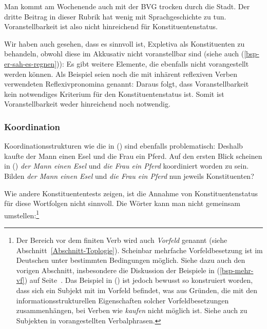 \documentclass[ number=45
			   ,series=eotms
			   ,printondemand
			  ]{langsci}
\let\citew=\citealp
\begin{document}
{\eal
\ex Man kommt am Wochenende auch mit der BVG trocken durch die Stadt.
\ex Der dritte Beitrag in dieser Rubrik hat wenig mit Sprachgeschichte zu tun.
\zl
Voranstellbarkeit ist also nicht hinreichend für Konstituentenstatus.

Wir haben auch gesehen, dass es sinnvoll ist, Expletiva als Konstituenten zu behandeln,
obwohl diese im Akkusativ nicht voranstellbar sind (siehe auch (\ref{bsp-er-sah-es-regnen})):
\eal
{}
\zl
Es gibt weitere Elemente, die ebenfalls nicht vorangestellt werden können. Als Beispiel
seien noch die mit inhärent reflexiven Verben verwendeten Reflexivpronomina genannt:
\eal
{}
\zl
Daraus folgt, dass Voranstellbarkeit kein notwendiges Kriterium für den Konstituentenstatus
ist. Somit ist Voranstellbarkeit weder hinreichend noch notwendig.


\subsubsection{Koordination}
\label{Abschnitt-K-Tests-Koordination}

Koordinationsstrukturen wie die in () sind ebenfalls problematisch:
\ea
\label{ex-gapping}
Deshalb kaufte der Mann einen Esel und die Frau ein Pferd.
\z
Auf den ersten Blick scheinen in () \emph{der Mann einen Esel} und \emph{die Frau ein Pferd}
koordiniert worden zu sein. Bilden \emph{der Mann einen Esel} und \emph{die Frau ein Pferd} nun jeweils Konstituenten?

Wie andere Konstituententests zeigen, ist die Annahme von Konstituentenstatus für diese Wortfolgen
nicht sinnvoll. Die Wörter kann man nicht gemeinsam umstellen:\footnote{
  Der Bereich vor dem finiten Verb wird auch \emph{Vorfeld} genannt (siehe Abschnitt~\ref{Abschnitt-Toplogie}).
  Scheinbar mehrfache Vorfeldbesetzung ist im Deutschen unter bestimmten
  Bedingungen möglich. Siehe dazu auch den vorigen Abschnitt, insbesondere
  die Diskussion der Beispiele in (\ref{bsp-mehr-vf}) auf Seite~\pageref{bsp-mehr-vf}.
  Das Beispiel in () ist jedoch bewusst so konstruiert worden, 
  dass sich ein Subjekt mit im Vorfeld befindet, was aus Gründen, die 
  mit den informationsstrukturellen Eigenschaften solcher Vorfeldbesetzungen
  zusammenhängen, bei Verben wie \emph{kaufen} nicht möglich ist. Siehe auch
  \citew{dKM2003a}
zu Subjekten in vorangestellten Verbalphrasen.%
}
\z

}
\end{document}
